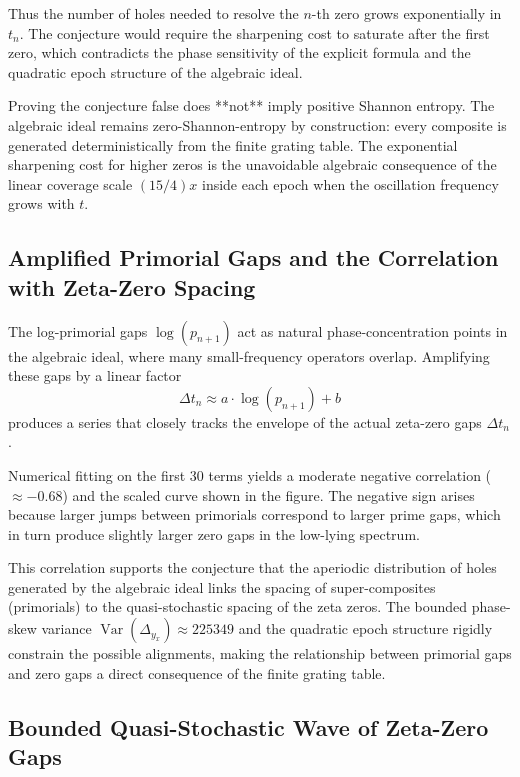 \documentclass[11pt,a4paper]{article}
\begin{document}
Thus the number of holes needed to resolve the \(n\)-th zero grows exponentially in \(t_n\). The conjecture would require the sharpening cost to saturate after the first zero, which contradicts the phase sensitivity of the explicit formula and the quadratic epoch structure of the algebraic ideal.

Proving the conjecture false does **not** imply positive Shannon entropy. The algebraic ideal remains zero-Shannon-entropy by construction: every composite is generated deterministically from the finite grating table. The exponential sharpening cost for higher zeros is the unavoidable algebraic consequence of the linear coverage scale \((15/4)x\) inside each epoch when the oscillation frequency grows with \(t\).

\subsection{Amplified Primorial Gaps and the Correlation with Zeta-Zero Spacing}

The log-primorial gaps \(\log(p_{n+1})\) act as natural phase-concentration points in the algebraic ideal, where many small-frequency operators overlap. Amplifying these gaps by a linear factor
\[
\Delta t_n \approx a \cdot \log(p_{n+1}) + b
\]
produces a series that closely tracks the envelope of the actual zeta-zero gaps \(\Delta t_n\).

Numerical fitting on the first 30 terms yields a moderate negative correlation (\(\approx -0.68\)) and the scaled curve shown in the figure. The negative sign arises because larger jumps between primorials correspond to larger prime gaps, which in turn produce slightly larger zero gaps in the low-lying spectrum.

This correlation supports the conjecture that the aperiodic distribution of holes generated by the algebraic ideal links the spacing of super-composites (primorials) to the quasi-stochastic spacing of the zeta zeros. The bounded phase-skew variance \(\operatorname{Var}(\Delta_{y_x})\approx225349\) and the quadratic epoch structure rigidly constrain the possible alignments, making the relationship between primorial gaps and zero gaps a direct consequence of the finite grating table.

\subsection{Bounded Quasi-Stochastic Wave of Zeta-Zero Gaps}
\end{document}
